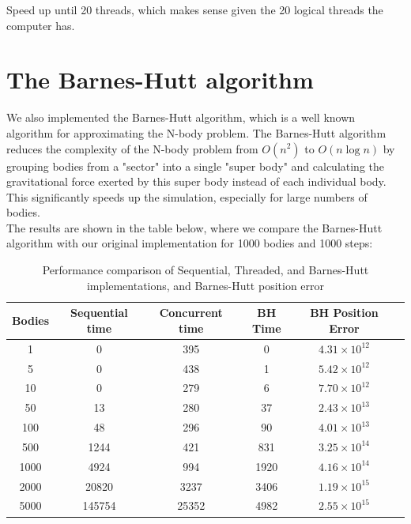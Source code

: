 \documentclass{article}
\begin{document}
Speed up until 20 threads, which makes sense given the 20 logical threads the computer has.		

\section{The Barnes-Hutt algorithm}
We also implemented the Barnes-Hutt algorithm, which is a well known algorithm for approximating the N-body problem. The Barnes-Hutt algorithm reduces the complexity of the N-body problem from $O(n^2)$ to $O(n \log n)$ by grouping bodies from a "sector" into a single "super body" and calculating the gravitational force exerted by this super body instead of each individual body. This significantly speeds up the simulation, especially for large numbers of bodies.\\

The results are shown in the table below, where we compare the Barnes-Hutt algorithm with our original implementation for 1000 bodies and 1000 steps:
\begin{table}[h]
    \centering
    \begin{tabular}{|c|c|c|c|c|c|}
        \hline
        Bodies & Sequential time & Concurrent time & BH Time & BH Position Error \\ \hline
        1     & 0     & 395   & 0    & $4.31 \times 10^{12}$ \\ \hline
        5     & 0     & 438   & 1    & $5.42 \times 10^{12}$ \\ \hline
        10    & 0     & 279   & 6    & $7.70 \times 10^{12}$ \\ \hline
        50    & 13    & 280   & 37   & $2.43 \times 10^{13}$ \\ \hline
        100   & 48    & 296   & 90   & $4.01 \times 10^{13}$ \\ \hline
        500   & 1244  & 421   & 831  & $3.25 \times 10^{14}$ \\ \hline
        1000  & 4924  & 994   & 1920 & $4.16 \times 10^{14}$ \\ \hline
        2000  & 20820 & 3237  & 3406 & $1.19 \times 10^{15}$ \\ \hline
        5000  & 145754& 25352 & 4982 & $2.55 \times 10^{15}$ \\ \hline
    \end{tabular}
    \caption{Performance comparison of Sequential, Threaded, and Barnes-Hutt implementations, and Barnes-Hutt position error}
    \label{tab:bh_comparison}
\end{table}
\end{document}
